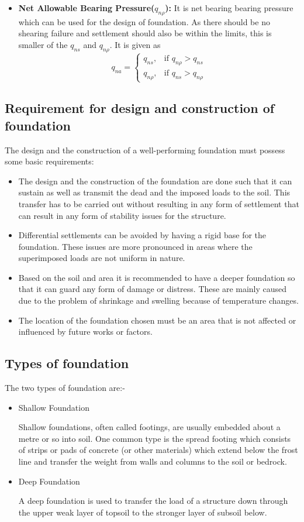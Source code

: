 \begin{itemize}
\item \textbf{Net Allowable Bearing Pressure($q_{n\rho}$):} It is net bearing bearing pressure which can be used for the design of foundation. As there should be no shearing failure and settlement should also be within the limits, this is smaller of the $q_{ns}$ and $q_{n\rho}$. It is given as
\begin{equation}
q_{na} = \begin{cases}
    q_{ns}, & \text{if } q_{n\rho} > q_{ns}\\
	q_{n\rho}, & \text{if } q_{ns} > q_{n\rho}
	\end{cases}
\end{equation}
\end{itemize}

\subsection{Requirement for design and construction of foundation}
The design and the construction of a well-performing foundation must possess some basic requirements: 
\begin{itemize}
	\item 	The design and the construction of the foundation are done such that it can sustain as well as transmit the dead and the imposed loads to the soil. This transfer has to be carried out without resulting in any form of settlement that can result in any form of stability issues for the structure.
	\item Differential settlements can be avoided by having a rigid base for the foundation. These issues are more pronounced in areas where the superimposed loads are not uniform in nature.
	\item Based on the soil and area it is recommended to have a deeper foundation so that it can guard any form of damage or distress. These are mainly caused due to the problem of shrinkage and swelling because of temperature changes.
	\item The location of the foundation chosen must be an area that is not affected or influenced by future works or factors.
\end{itemize}

\subsection{Types of foundation}
The two types of foundation are:-
\begin{itemize}
  \item Shallow Foundation
  \par
  Shallow foundations, often called footings, are usually embedded about a metre or so into soil. One common type is the spread footing which consists of strips or pads of concrete (or other materials) which extend below the frost line and transfer the weight from walls and columns to the soil or bedrock.
  \item Deep Foundation
  \par
  A deep foundation is used to transfer the load of a structure down through the upper weak layer of topsoil to the stronger layer of subsoil below.
\end{itemize}

